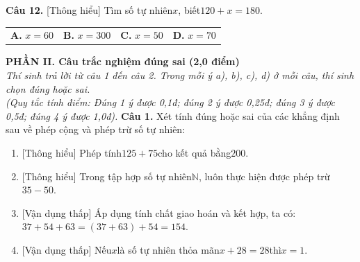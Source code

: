 \documentclass[11pt,a4paper]{article}
\begin{document}
\noindent\textbf{Câu 12.} [Thông hiểu] Tìm số tự nhiên$x$, biết$120 + x = 180$.\par\vspace{2pt}
\noindent\begin{tabular*}{\textwidth}{@{\extracolsep{\fill}}llll@{}}
\textbf{A.} $x = 60$ & \textbf{B.} $x = 300$ & \textbf{C.} $x = 50$ & \textbf{D.} $x = 70$
\end{tabular*}\par\vspace{5pt}


\vspace{6pt}
\noindent
\textbf{\large PHẦN II. Câu trắc nghiệm đúng sai (2,0 điểm)}\\
\textit{\small Thí sinh trả lời từ câu 1 đến câu 2. Trong mỗi ý a), b), c), d) ở mỗi câu, thí sinh chọn đúng hoặc sai.}\\
\textit{\small (Quy tắc tính điểm: Đúng 1 ý được 0,1đ; đúng 2 ý được 0,25đ; đúng 3 ý được 0,5đ; đúng 4 ý được 1,0đ).}
\vspace{6pt}
\noindent\textbf{Câu 1.} Xét tính đúng hoặc sai của các khẳng định sau về phép cộng và phép trừ số tự nhiên:\par\vspace{2pt}
\begin{enumerate}[label=\textbf{\alph*)}, leftmargin=1.2cm, itemsep=2pt, topsep=2pt]
  \item \textnormal{[Thông hiểu]} Phép tính$125 + 75$cho kết quả bằng$200$.
  \item \textnormal{[Thông hiểu]} Trong tập hợp số tự nhiên$\mathbb{N}$, luôn thực hiện được phép trừ$35 - 50$.
  \item \textnormal{[Vận dụng thấp]} Áp dụng tính chất giao hoán và kết hợp, ta có:$37 + 54 + 63 = (37 + 63) + 54 = 154$.
  \item \textnormal{[Vận dụng thấp]} Nếu$x$là số tự nhiên thỏa mãn$x + 28 = 28$thì$x = 1$.
\end{enumerate}
\vspace{6pt}
\end{document}
